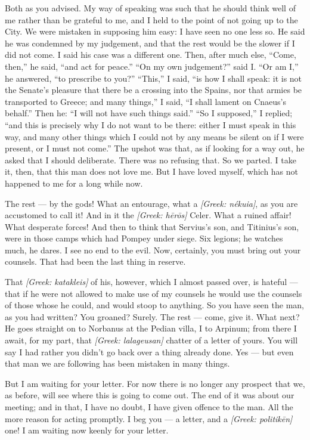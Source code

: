 

 Both as you advised. My way of speaking was such that he should think well of me rather than be grateful to me, and I held to the point of not going up to the City. We were mistaken in supposing him easy: I have seen no one less so. He said he was condemned by my judgement, and that the rest would be the slower if I did not come. I said his case was a different one. Then, after much else, ``Come, then,'' he said, ``and act for peace.'' ``On my own judgement?'' said I. ``Or am I,'' he answered, ``to prescribe to you?'' ``This,'' I said, ``is how I shall speak: it is not the Senate's pleasure that there be a crossing into the Spains, nor that armies be transported to Greece; and many things,'' I said, ``I shall lament on Cnaeus's behalf.'' Then he: ``I will not have such things said.'' ``So I supposed,'' I replied; ``and this is precisely why I do not want to be there: either I must speak in this way, and many other things which I could not by any means be silent on if I were present, or I must not come.'' The upshot was that, as if looking for a way out, he asked that I should deliberate. There was no refusing that. So we parted. I take it, then, that this man does not love me. But I have loved myself, which has not happened to me for a long while now.

 The rest --- by the gods! What an entourage, what a \textit{[Greek: n\'ekuia]}, as you are accustomed to call it! And in it the \textit{[Greek: h\=er\=os]} Celer. What a ruined affair! What desperate forces! And then to think that Servius's son, and Titinius's son, were in those camps which had Pompey under siege. Six legions; he watches much, he dares. I see no end to the evil. Now, certainly, you must bring out your counsels. That had been the last thing in reserve.

 That \textit{[Greek: katakleis]} of his, however, which I almost passed over, is hateful --- that if he were not allowed to make use of my counsels he would use the counsels of those whose he could, and would stoop to anything. So you have seen the man, as you had written? You groaned? Surely. The rest --- come, give it. What next? He goes straight on to Norbanus at the Pedian villa, I to Arpinum; from there I await, for my part, that \textit{[Greek: lalageusan]} chatter of a letter of yours. You will say I had rather you didn't go back over a thing already done. Yes --- but even that man we are following has been mistaken in many things.

 But I am waiting for your letter. For now there is no longer any prospect that we, as before, will see where this is going to come out. The end of it was about our meeting; and in that, I have no doubt, I have given offence to the man. All the more reason for acting promptly. I beg you --- a letter, and a \textit{[Greek: politik\=en]} one! I am waiting now keenly for your letter.
